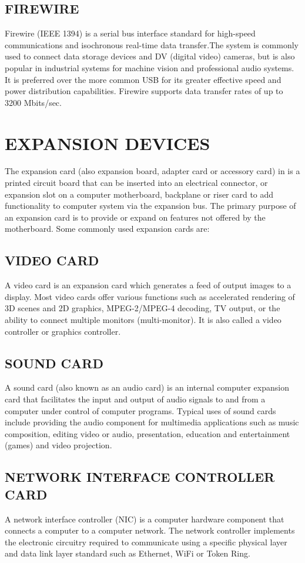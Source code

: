 		\subsection{ FIREWIRE}
	 Firewire (IEEE 1394) is a serial bus interface standard for high-speed communications
	and isochronous real-time data transfer.The system is commonly used to connect data storage
	devices and DV (digital video) cameras, but is also popular in industrial systems for machine vision and
	professional audio systems. It is preferred over the more common USB for its greater effective speed and
	power distribution capabilities. Firewire supports data transfer rates of up to 3200 Mbits/sec.
		\section{EXPANSION DEVICES}
	The expansion card (also expansion board, adapter card or accessory card) in is a printed circuit board that can
	be inserted into an electrical connector, or expansion slot on a computer motherboard, backplane or riser card to
	add functionality to computer system via the expansion bus. The primary purpose of an expansion card is to
	provide or expand on features not offered by the motherboard. Some commonly used expansion cards are:
		\subsection{VIDEO CARD} 
	A video card is an expansion card which generates a feed of output images to a display.
	Most video cards offer various functions such as accelerated rendering of 3D scenes and 2D graphics,
	MPEG-2/MPEG-4 decoding, TV output, or the ability to connect multiple monitors (multi-monitor). It is
	also called a video controller or graphics controller.
	\subsection{SOUND CARD}
	 A sound card (also known as an audio card) is an internal computer expansion card that
	facilitates the input and output of audio signals to and from a computer under control of computer
	programs. Typical uses of sound cards include providing the audio component for multimedia applications
	such as music composition, editing video or audio, presentation, education and entertainment (games) and
	video projection.
	\subsection{ NETWORK INTERFACE CONTROLLER CARD}
	 A network interface controller (NIC) is a computer hardware component
	that connects a computer to a computer network. The network controller implements the electronic circuitry
	required to communicate using a specific physical layer and data link layer standard such as Ethernet, WiFi
	or Token Ring.
